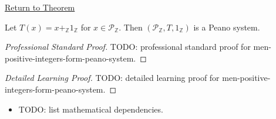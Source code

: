 \newpage
{}
\label{prf:men-positive-integers-form-peano-system}

\begin{remark*}[Return]
\hyperref[thm:men-positive-integers-form-peano-system]{Return to Theorem}
\end{remark*}

\begin{theorem*}
Let $T(x)=x+_\mathbb{Z}1_\mathbb{Z}$ for $x\in\mathcal{P}_\mathbb{Z}$.
Then $(\mathcal{P}_\mathbb{Z},T,1_\mathbb{Z})$ is a Peano system.
\end{theorem*}

\begin{proof}[Professional Standard Proof]
\LRAProofBodyStart
TODO: professional standard proof for men-positive-integers-form-peano-system.
\end{proof}

\begin{proof}[Detailed Learning Proof]
\LRAProofBodyStart
TODO: detailed learning proof for men-positive-integers-form-peano-system.
\end{proof}

\begin{remark*}
\end{remark*}

\begin{dependencies}
\begin{itemize}
  \item TODO: list mathematical dependencies.
\end{itemize}
\end{dependencies}

\clearpage
